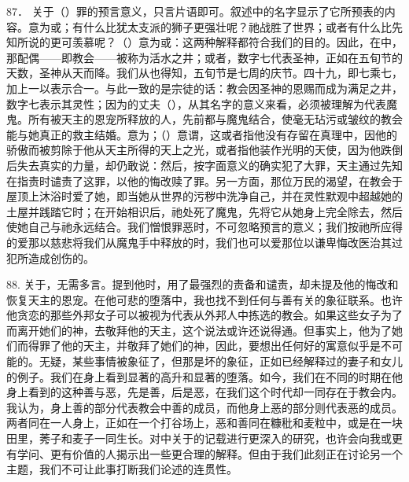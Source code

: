 87． 关于（）罪的预言意义，只言片语即可。叙述中的名字显示了它所预表的内容。意为或；有什么比犹太支派的狮子更强壮呢？祂战胜了世界；或者有什么比先知所说的更可羡慕呢？（）意为或：这两种解释都符合我们的目的。因此，在中，那配偶——即教会——被称为活水之井；或者，数字七代表圣神，正如在五旬节的天数，圣神从天而降。我们从也得知，五旬节是七周的庆节。四十九，即七乘七，加上一以表示合一。与此一致的是宗徒的话：教会因圣神的恩赐而成为满足之井，数字七表示其灵性；因为的丈夫（），从其名字的意义来看，必须被理解为代表魔鬼。所有被天主的恩宠所释放的人，先前都与魔鬼结合，使毫无玷污或皱纹的教会能与她真正的救主结婚。意为；（）意谓，这或者指他没有存留在真理中，因他的骄傲而被剪除于他从天主所得的天上之光，或者指他装作光明的天使，因为他跌倒后失去真实的力量，却仍敢说：然后，按字面意义的确实犯了大罪，天主通过先知在指责时谴责了这罪，以他的悔改赎了罪。另一方面，那位万民的渴望，在教会于屋顶上沐浴时爱了她，即当她从世界的污秽中洗净自己，并在灵性默观中超越她的土屋并践踏它时；在开始相识后，祂处死了魔鬼，先将它从她身上完全除去，然后使她自己与祂永远结合。我们憎恨罪恶时，不可忽略预言的意义；我们按祂所应得的爱那以慈悲将我们从魔鬼手中释放的时，我们也可以爱那位以谦卑悔改医治其过犯所造成创伤的。\par

88. 关于，无需多言。提到他时，用了最强烈的责备和谴责，却未提及他的悔改和恢复天主的恩宠。在他可悲的堕落中，我也找不到任何与善有关的象征联系。也许他贪恋的那些外邦女子可以被视为代表从外邦人中拣选的教会。如果这些女子为了而离开她们的神，去敬拜他的天主，这个说法或许还说得通。但事实上，他为了她们而得罪了他的天主，并敬拜了她们的神，因此，要想出任何好的寓意似乎是不可能的。无疑，某些事情被象征了，但那是坏的象征，正如已经解释过的妻子和女儿的例子。我们在身上看到显著的高升和显著的堕落。如今，我们在不同的时期在他身上看到的这种善与恶，先是善，后是恶，在我们这个时代却一同存在于教会内。我认为，身上善的部分代表教会中善的成员，而他身上恶的部分则代表恶的成员。两者同在一人身上，正如在一个打谷场上，恶和善同在糠秕和麦粒中，或是在一块田里，莠子和麦子一同生长。对中关于的记载进行更深入的研究，也许会向我或更有学问、更有价值的人揭示出一些更合理的解释。但由于我们此刻正在讨论另一个主题，我们不可让此事打断我们论述的连贯性。\par

